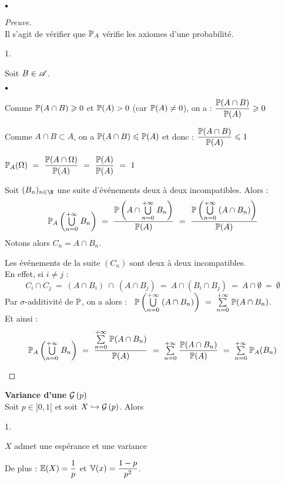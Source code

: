 \documentclass[11pt]{article}%
\begin{document}
\begin{noliste}{$\scriptstyle \bullet$}
\begin{proof}[Preuve]~\\
  Il s'agit de vérifier que $\mathbb{P}_A$ vérifie les axiomes d'une
  probabilité.
  \begin{noliste}{1.}
  \item Soit $B \in \mathscr{A}$.
    \begin{noliste}{$\scriptstyle \bullet$}
    \item Comme $\mathbb{P}(A \cap B) \geqslant 0$ et $\mathbb{P}(A) > 0$ (car
      $\mathbb{P}(A) \neq 0$), on a : $\dfrac{\mathbb{P}(A \cap B)}
      {\mathbb{P}(A)} \geqslant 0$

    \item Comme $A \cap B \subset A$, on a $\mathbb{P}(A \cap B) \leqslant
      \mathbb{P}(A)$ et donc : $\dfrac{\mathbb{P}(A \cap B)} {\mathbb{P}(A)} \leqslant 1$
      
    \end{noliste}

  \item $\mathbb{P}_A(\Omega) \ = \ \dfrac{\mathbb{P}(A \cap \Omega)}{\mathbb{P}(A)}
    \ = \ \dfrac{\mathbb{P}(A)}{\mathbb{P}(A)} \ = \ 1$

  \item Soit $(B_n)_{n\in \N}$ une suite d'événements deux à deux
    incompatibles. Alors :
    \[
    \Prob_A\left(\dcup{n = 0}{+\infty} B_n\right) \ = \ 
\dfrac{\Prob\left(A \cap
      \dcup{n = 0}{+\infty} B_n\right)}{\Prob(A)} \ = \ 
\dfrac{\Prob\left(\dcup{n
        = 0}{+\infty} (A \cap B_n)\right)}{\Prob(A)}
    \]    
    Notons alors $C_n = A \cap B_n$.     

    \noindent
    Les événements de la suite $(C_n)$ sont deux à deux
    incompatibles.\\
    En effet, si $i \neq j$ :
    \[
    C_i \cap C_j \ = \ (A \cap B_i) \ \cap \ (A \cap B_j) \ = \ A \cap
    (B_i \cap B_j) \ = \ A \cap \emptyset \ = \ \emptyset
    \]
    Par $\sigma$-additivité de $\mathbb{P}$, on a alors : \ $ 
\mathbb{P}\left({\textstyle\bigcup\limits_{n
      = 0}^{+\infty}}\hspace{.1cm} (A \cap B_n)\right) \ = \ {\textstyle\sum\limits_{n = 0}^{+\infty}}\hspace{.1cm} 
\mathbb{P}(A
    \cap B_n)$.\\
    Et ainsi :
    \[
    \Prob_A\left(\dcup{n = 0}{+\infty} B_n\right) \ = \ \dfrac{\Sum{n =
        0}{+\infty} \Prob(A \cap B_n)}{\Prob(A)} \ = \ \Sum{n =
      0}{+\infty} \dfrac{\Prob(A \cap B_n)}{\Prob(A)} \ = \ 
    \Sum{n = 0}{+\infty} \Prob_A(B_n) %
    \]
  \end{noliste}
\end{proof}


\newpage


\item {\bf Variance d'une $\mathcal{G}\left(p\right)$}\\
Soit $p \in ]0,1[$ et soit $X \hookrightarrow \mathcal{G}\left(p\right)$. Alors 
\begin{noliste}{1.}
\item $X$ admet une 
espérance et une variance
\item De plus : $\mathbb{E}(X) = \dfrac{1}{p}$ \qquad et \qquad $\mathbb{V}(x) = 
\dfrac{1 -  p}{p^2}$.
\end{noliste}


\end{noliste}
\end{document}
